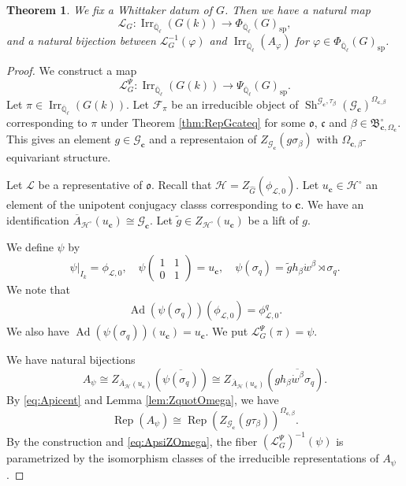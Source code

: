 \documentclass[12pt,a4paper]{article}
\newtheorem{thm}{Theorem}[section]
\DeclareMathOperator{\Rep}{Rep}
\DeclareMathOperator{\Irr}{Irr}
\DeclareMathOperator{\Ad}{Ad}
\DeclareMathOperator{\Sh}{Sh}
\newcommand{\mb}{\mathbb}
\newcommand{\mc}{\mathcal}
\newcommand{\mr}{\mathrm}
\newcommand{\mf}{\mathfrak}
\newcommand{\mbf}{\mathbf}
\newcommand{\ol}{\overline}
\newcommand{\wh}{\widehat}
\newcommand{\wt}{\widetilde}
\begin{document}
\begin{thm}\label{thm:LCfin}
We fix a Whittaker datum of $G$. 
Then we have a natural map 
	\[
	\mc{L}_G \colon \Irr_{\ol{\mb{Q}}_{\ell}}(G(k)) \to 
	\Phi_{\ol{\mb{Q}}_{\ell}}(G)_{\mr{sp}},  
	\]
and a natural bijection between $\mc{L}_G^{-1}(\varphi)$ and 
$\Irr_{\ol{\mb{Q}}_{\ell}}(A_{\varphi})$ for $\varphi \in \Phi_{\ol{\mb{Q}}_{\ell}}(G)_{\mr{sp}}$. 
\end{thm}
\begin{proof}
We construct a map 
	\begin{equation}
	\mc{L}_G^{\Psi} \colon \Irr_{\ol{\mb{Q}}_{\ell}}(G(k))  \to 
		\Psi_{\ol{\mb{Q}}_{\ell}}(G)_{\mr{sp}}. 
	\end{equation}
Let $\pi \in \Irr_{\ol{\mb{Q}}_{\ell}}(G(k))$. 
Let $\mc{F}_{\pi}$ be an irreducible object of 
$\Sh^{\mc{G}_{\mbf{c}},\tau_{\beta}}(\mc{G}_{\mbf{c}})^{\Omega_{\mbf{c},\beta}}$ corresponding to $\pi$ under 
Theorem \ref{thm:RepGcateq} 
for some $\mf{o}$, $\mf{c}$ and 
$\beta \in \mf{B}_{\mbf{c},\Omega_{\mbf{c}}}^{\circ}$. 
This gives an element $g \in \mc{G}_{\mbf{c}}$ and a representaion of $Z_{\mc{G}_{\mbf{c}}}(g\sigma_{\beta})$ with $\Omega_{\mbf{c},\beta}$-equivariant structure. 

Let $\mc{L}$ be a representative of $\mf{o}$. 
Recall that $\mc{H}=Z_{\wh{G}}(\phi_{\mc{L},0})$. 
Let $u_{\mbf{c}} \in \mc{H}^{\circ}$ an element of the unipotent conjugacy classs corresponding to $\mbf{c}$. 
We have an identification 
$\ol{A}_{\mc{H}^{\circ}}(u_{\mbf{c}}) \cong \mc{G}_{\mbf{c}}$. 
Let $\wt{g} \in Z_{\mc{H}^{\circ}}(u_{\mbf{c}})$ be a lift of $g$. 

We define $\psi$ by 
\[	 
 \psi|_{I_k}=\phi_{\mc{L},0}, \quad 
\psi \begin{pmatrix}
	1 & 1 \\ 0 & 1 
\end{pmatrix}=u_{\mbf{c}}, \quad  
\psi (\sigma_q) = \wt{g} h_{\beta} \dot{w}^{\beta} \rtimes \sigma_q. 
\]
	We note that 
\begin{align*}
	\Ad(\psi (\sigma_q))(\phi_{\mc{L},0})=\phi_{\mc{L},0}^q. 
\end{align*}
We also have 
$\Ad (\psi (\sigma_q))(u_{\mbf{c}})=u_{\mbf{c}}$. 
We put $\mc{L}_G^{\Psi} (\pi)=\psi$. 

We have natural bijections 
\begin{equation}\label{eq:Apicent}
	A_{\psi}\cong Z_{\ol{A}_{\mc{H}}(u_{\mbf{c}})}(\ol{\psi(\sigma_q)}) \cong Z_{\ol{A}_{\mc{H}}(u_{\mbf{c}})}(g \ol{h_{\beta} \dot{w}^{\beta} \sigma_q}).
\end{equation}
By \eqref{eq:Apicent} and Lemma \ref{lem:ZquotOmega}, 
we have 
\begin{equation}\label{eq:ApsiZOmega}
\Rep (A_{\psi}) \cong \Rep (Z_{\mc{G}_{\mbf{c}}}(g \tau_{\beta}))^{\Omega_{\mbf{c},\beta}} . 
\end{equation}
By the construction and \eqref{eq:ApsiZOmega}, the fiber $(\mc{L}_G^{\Psi})^{-1}(\psi)$ 
is parametrized by 
the isomorphism classes of the irreducible representations of $A_{\psi}$. 


\end{proof}
\end{document}
